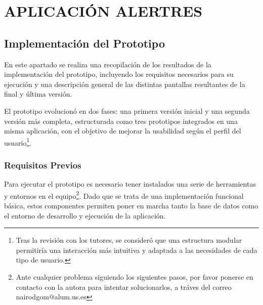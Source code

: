 
\chapter{APLICACIÓN ALERTRES}\label{resultados_app}



\section{Implementación del Prototipo}\label{implementacionProt}

En este apartado se realiza una recopilación de los resultados de la implementación del prototipo, incluyendo los requisitos necesarios para su ejecución y una descripción general de las distintas pantallas resultantes de la final y última versión. 

El prototipo evolucionó en dos fases: una primera versión inicial y una segunda versión más completa, estructurada como tres prototipos integrados en una misma aplicación, con el objetivo de mejorar la usabilidad según el perfil del usuario\footnote{Tras la revisión con los tutores, se consideró que una estructura modular permitiría una interacción más intuitiva y adaptada a las necesidades de cada tipo de usuario.}.

\subsection{Requisitos Previos}

Para ejecutar el prototipo es necesario tener instalados una serie de herramientas y entornos en el equipo\footnote{Ante cualquier problema siguiendo los siguientes pasos, por favor ponerse en contacto con la autora para intentar solucionarlos, a tráves del correo nairodgom@alum.us.es}. Dado que se trata de una implementación funcional básica, estos componentes permiten poner en marcha tanto la base de datos como el entorno de desarrollo y ejecución de la aplicación.

